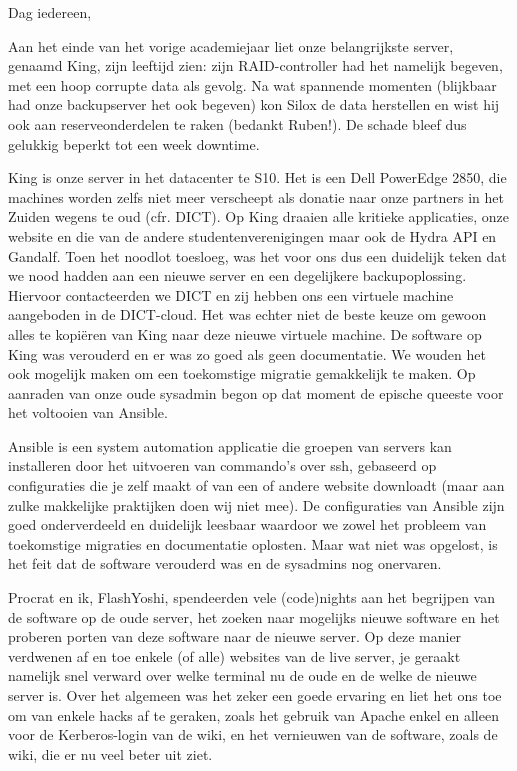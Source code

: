 \documentclass{article}
\begin{document}
Dag iedereen,

Aan het einde van het vorige academiejaar liet onze belangrijkste server, genaamd King, zijn leeftijd zien: zijn RAID-controller had het namelijk begeven, met een hoop corrupte data als gevolg.
Na wat spannende momenten (blijkbaar had onze backupserver het ook begeven) kon Silox de data herstellen en wist hij ook aan reserveonderdelen te raken (bedankt Ruben!).
De schade bleef dus gelukkig beperkt tot een week downtime.

King is onze server in het datacenter te S10.
Het is een Dell PowerEdge 2850, die machines worden zelfs niet meer verscheept als donatie naar onze partners in het Zuiden wegens te oud (cfr. DICT).
Op King draaien alle kritieke applicaties, onze website en die van de andere studentenverenigingen maar ook de Hydra API en Gandalf. Toen het noodlot toesloeg, was het voor ons dus een duidelijk teken dat we nood hadden aan een nieuwe server en een degelijkere backupoplossing.
Hiervoor contacteerden we DICT en zij hebben ons een virtuele machine aangeboden in de DICT-cloud.
Het was echter niet de beste keuze om gewoon alles te kopiëren van King naar deze nieuwe virtuele machine.
De software op King was verouderd en er was zo goed als geen documentatie.
We wouden het ook mogelijk maken om een toekomstige migratie gemakkelijk te maken.
Op aanraden van onze oude sysadmin begon op dat moment de epische queeste voor het voltooien van Ansible.

Ansible is een system automation applicatie die groepen van servers kan installeren door het uitvoeren van commando’s over ssh, gebaseerd op configuraties die je zelf maakt of van een of andere website downloadt (maar aan zulke makkelijke praktijken doen wij niet mee).
De configuraties van Ansible zijn goed onderverdeeld en duidelijk leesbaar waardoor we zowel het probleem van toekomstige migraties en documentatie oplosten. Maar wat niet was opgelost, is het feit dat de software verouderd was en de sysadmins nog onervaren.

Procrat en ik, FlashYoshi, spendeerden vele (code)nights aan het begrijpen van de software op de oude server, het zoeken naar mogelijks nieuwe software en het proberen porten van deze software naar de nieuwe server.
Op deze manier verdwenen af en toe enkele (of alle) websites van de live server, je geraakt namelijk snel verward over welke terminal nu de oude en de welke de nieuwe server is.
Over het algemeen was het zeker een goede ervaring en liet het ons toe om van enkele hacks af te geraken, zoals het gebruik van Apache enkel en alleen voor de Kerberos-login van de wiki, en het vernieuwen van de software, zoals de wiki, die er nu veel beter uit ziet.
\end{document}
